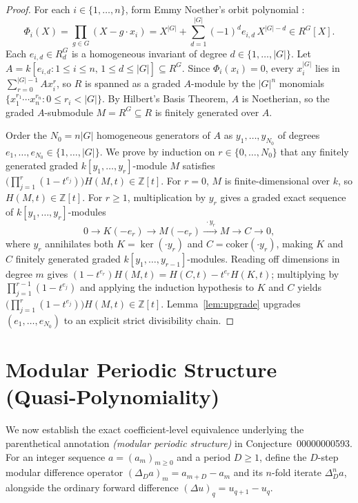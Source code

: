 \documentclass[11pt]{article}
\theoremstyle{definition}
\theoremstyle{remark}
\begin{document}
\begin{proof}
For each $i \in \{1,\dots,n\}$, form Emmy Noether's orbit polynomial \cite{Noether1926}:
\[
\Phi_i(X) = \prod_{g \in G} (X - g \cdot x_i) = X^{|G|} + \sum_{d=1}^{|G|} (-1)^d e_{i,d}\, X^{|G|-d} \in R^G[X].
\]
Each $e_{i,d} \in R_d^G$ is a homogeneous invariant of degree $d \in \{1,\dots,|G|\}$. Let $A = k[e_{i,d} : 1 \le i \le n,\, 1 \le d \le |G|] \subseteq R^G$. Since $\Phi_i(x_i) = 0$, every $x_i^{|G|}$ lies in $\sum_{r=0}^{|G|-1} A x_i^r$, so $R$ is spanned as a graded $A$-module by the $|G|^n$ monomials $\{x_1^{r_1}\cdots x_n^{r_n} : 0 \le r_i < |G|\}$. By Hilbert's Basis Theorem, $A$ is Noetherian, so the graded $A$-submodule $M = R^G \subseteq R$ is finitely generated over $A$.

Order the $N_0 = n|G|$ homogeneous generators of $A$ as $y_1,\dots,y_{N_0}$ of degrees $e_1,\dots,e_{N_0} \in \{1,\dots,|G|\}$. We prove by induction on $r \in \{0,\dots,N_0\}$ that any finitely generated graded $k[y_1,\dots,y_r]$-module $M$ satisfies $\bigl(\prod_{j=1}^r (1 - t^{e_j})\bigr) H(M, t) \in \mathbb{Z}[t]$. For $r = 0$, $M$ is finite-dimensional over $k$, so $H(M, t) \in \mathbb{Z}[t]$. For $r \ge 1$, multiplication by $y_r$ gives a graded exact sequence of $k[y_1,\dots,y_r]$-modules
\[
0 \longrightarrow K(-e_r) \longrightarrow M(-e_r) \xrightarrow{\;\cdot y_r\;} M \longrightarrow C \longrightarrow 0,
\]
where $y_r$ annihilates both $K = \ker(\cdot y_r)$ and $C = \mathrm{coker}(\cdot y_r)$, making $K$ and $C$ finitely generated graded $k[y_1,\dots,y_{r-1}]$-modules. Reading off dimensions in degree $m$ gives $(1 - t^{e_r}) H(M, t) = H(C, t) - t^{e_r} H(K, t)$; multiplying by $\prod_{j=1}^{r-1} (1 - t^{e_j})$ and applying the induction hypothesis to $K$ and $C$ yields $\bigl(\prod_{j=1}^r (1 - t^{e_j})\bigr) H(M, t) \in \mathbb{Z}[t]$. Lemma~\ref{lem:upgrade} upgrades $(e_1,\dots,e_{N_0})$ to an explicit strict divisibility chain.
\end{proof}

\section{Modular Periodic Structure (Quasi-Polynomiality)}

We now establish the exact coefficient-level equivalence underlying the parenthetical annotation \emph{(modular periodic structure)} in Conjecture~00000000593. For an integer sequence $a = (a_m)_{m \ge 0}$ and a period $D \ge 1$, define the $D$-step modular difference operator $(\Delta_D a)_m = a_{m+D} - a_m$ and its $n$-fold iterate $\Delta_D^n a$, alongside the ordinary forward difference $(\Delta u)_q = u_{q+1} - u_q$.
\end{document}

